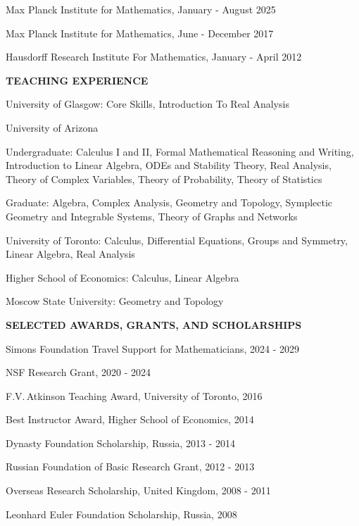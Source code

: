 \documentclass[a4paper, 12pt]{article}
\begin{document}
\begin{compactitem}
 \item Max Planck Institute for Mathematics, January - August 2025
 \item Max Planck Institute for Mathematics, June - December 2017
\item Hausdorff Research Institute For Mathematics, January - April 2012 %
\end{compactitem}
\par\quad\par\smallskip
\textbf{TEACHING EXPERIENCE}\par\smallskip
\begin{compactitem}
\item University of Glasgow:  Core Skills,  Introduction To Real Analysis
\item University of Arizona \begin{compactitem} \item Undergraduate: Calculus I and II, Formal Mathematical Reasoning and Writing,  Introduction to Linear Algebra, ODEs and Stability Theory, Real Analysis, Theory of Complex Variables, Theory of Probability, Theory of Statistics \item Graduate: Algebra, Complex Analysis, Geometry and Topology, Symplectic Geometry and Integrable Systems, Theory of Graphs and Networks\end{compactitem}
\item University of Toronto: Calculus, Differential Equations, Groups and Symmetry, Linear Algebra, Real Analysis
\item Higher School of Economics: Calculus, Linear Algebra
\item Moscow State University: Geometry and Topology
\end{compactitem}
\par\quad\par\smallskip
\textbf{SELECTED AWARDS, GRANTS, AND SCHOLARSHIPS}\par\smallskip
\begin{compactitem}
\item Simons Foundation Travel Support for Mathematicians, 2024 - 2029
\item NSF Research Grant, 2020 - 2024
\item  F.V.\,Atkinson Teaching Award, University of Toronto, 2016
\item Best Instructor Award, Higher School of Economics, 2014
\item Dynasty Foundation Scholarship, Russia, 2013 - 2014 
\item Russian Foundation of Basic Research Grant, 2012 - 2013 
\item  {{Overseas Research Scholarship}}, United Kingdom, 2008 - 2011
\item  {{Leonhard Euler Foundation}} Scholarship, Russia, 2008
\end{compactitem}
\par\quad\par\smallskip 
\end{document}

